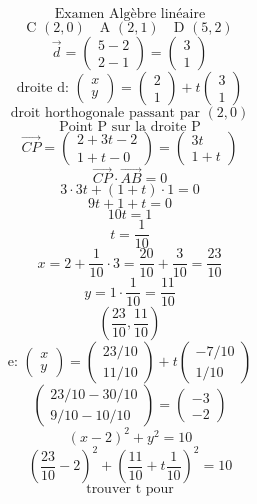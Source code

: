 \documentclass{article}
\begin{document}
\[ \text{Examen Algèbre linéaire} \]
\[ \text{C } (2,0) \quad \text{A } (2,1) \quad \text{D } (5,2) \]
\[ \vec{d} = \begin{pmatrix} 5-2 \\ 2-1 \end{pmatrix} = \begin{pmatrix} 3 \\ 1 \end{pmatrix} \]
\[ \text{droite d: } \begin{pmatrix} x \\ y \end{pmatrix} = \begin{pmatrix} 2 \\ 1 \end{pmatrix} + t \begin{pmatrix} 3 \\ 1 \end{pmatrix} \]
\[ \text{droit horthogonale passant par } (2,0) \]
\[ \text{Point P sur la droite P} \]
\[ \vec{CP} = \begin{pmatrix} 2+3t-2 \\ 1+t-0 \end{pmatrix} = \begin{pmatrix} 3t \\ 1 + t \end{pmatrix} \]
\[ \vec{CP} \cdot \vec{AB} = 0 \]
\[ 3 \cdot 3t + (1+t) \cdot 1 = 0 \]
\[ 9t + 1 + t = 0 \]
\[ 10t = 1 \]
\[ t = \frac{1}{10} \]
\[ x = 2 + \frac{1}{10} \cdot 3 = \frac{20}{10} + \frac{3}{10} = \frac{23}{10} \]
\[ y = 1 \cdot \frac{1}{10} = \frac{11}{10} \]
\[ \left( \frac{23}{10}, \frac{11}{10} \right) \]
\[ \text{e: } \begin{pmatrix} x \\ y \end{pmatrix} = \begin{pmatrix} 23/10 \\ 11/10 \end{pmatrix} + t \begin{pmatrix} -7/10 \\ 1/10 \end{pmatrix} \]
\[ \begin{pmatrix} 23/10 - 30/10 \\ 9/10 - 10/10 \end{pmatrix} = \begin{pmatrix} -3 \\ -2 \end{pmatrix} \]
\[ (x-2)^2 + y^2 = 10 \]
\[ \left( \frac{23}{10} - 2 \right)^2 + \left( \frac{11}{10} + t \frac{1}{10} \right)^2 = 10 \]
\[ \text{trouver t pour} \]
\end{document}
